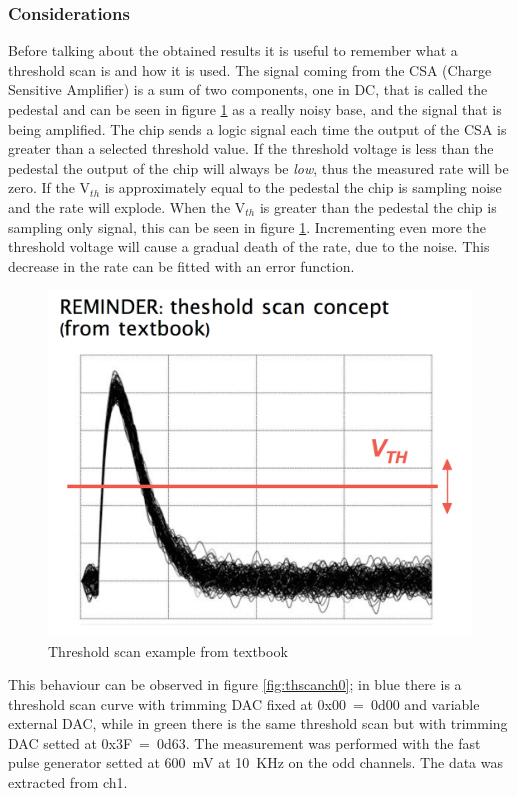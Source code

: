 \subsubsection{Considerations}\label{considerations}
\noindent Before talking about the obtained results it is useful to remember what a threshold scan is and how it is used.
The signal coming from the CSA (Charge Sensitive Amplifier) is a sum of two components, one in DC, that is called the pedestal and can be seen in figure \ref{fig:tscansketch} as a really noisy base, and the signal that is being amplified.
The chip sends a logic signal each time the output of the CSA is greater than a selected threshold value.
If the threshold voltage is less than the pedestal the output of the chip will always be \textit{low}, thus the measured rate will be zero.
If the V$_{th}$ is approximately equal to the pedestal the chip is sampling noise and the rate will explode.
When the V$_{th}$ is greater than the pedestal the chip is sampling only signal, this can be seen in figure \ref{fig:tscansketch}.
Incrementing even more the threshold voltage will cause a gradual death of the rate, due to the noise. This decrease in the rate can be fitted with an error function.
\begin{figure}[H]
	\centering
	\includegraphics[width=0.7\linewidth]{IMG/ch5/DataDacConfig/tscan_sketch}
	\caption{Threshold scan example from textbook}
	\label{fig:tscansketch}
\end{figure}
\noindent This behaviour can be observed in figure \ref{fig:thscanch0}; in blue there is a threshold scan curve with trimming DAC fixed at 0x00~=~0d00 and variable external DAC, while in green there is the same threshold scan but with trimming DAC setted at 0x3F~=~0d63.
The measurement was performed with the fast pulse generator setted at 600~mV at 10~KHz on the odd channels. The data was extracted from ch1.
